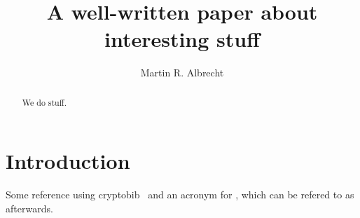 \documentclass[a4paper,10pt]{llncs}
\title{A well-written paper about interesting stuff}
\author{Martin R. Albrecht \inst{1}}
\institute{King's College London}
\begin{document}
\maketitle

\begin{abstract}
  We do stuff.
\end{abstract}

\section{Introduction}\label{sec:introduction}

Some reference using cryptobib~\cite{EC:AFLN24} and an acronym for \SIS, which can be refered to as \SIS afterwards.





\clearpage


\end{document}
